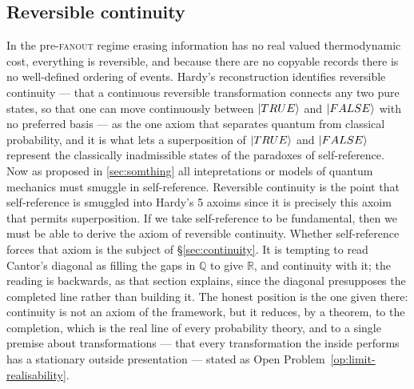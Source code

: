 \subsection{Reversible continuity}
\label{sec:reversible-continuity}
In the pre-\textsc{fanout} regime erasing information has no real valued thermodynamic cost, everything is
reversible, and because there are no copyable records there is no well-defined ordering of
events. Hardy's reconstruction \autocite{Hardy2001a} identifies reversible continuity --- that a
continuous reversible transformation connects any two pure states, so that one can move
continuously between $\ket{TRUE}$ and $\ket{FALSE}$ with no preferred basis --- as the one axiom
that separates quantum from classical probability, and it is what lets a superposition of
$\ket{TRUE}$ and $\ket{FALSE}$ represent the classically inadmissible states of the paradoxes of
self-reference. Now as proposed in \ref{sec:somthing} all intepretations or models of quantum mechanics
must smuggle in self-reference. Reversible continuity is the point that self-reference is
smuggled into Hardy's 5 axoims since it is precisely this axoim that permits superposition. 
If we take self-reference to be fundamental, then we must be able to derive the axiom of reversible
continuity. 
Whether self-reference forces that axiom is the subject of
\S\ref{sec:continuity}. It is tempting to read Cantor's diagonal as filling the gaps in
$\mathbb{Q}$ to give $\mathbb{R}$, and continuity with it; the reading is backwards, as that
section explains, since the diagonal presupposes the completed line rather than building it. The
honest position is the one given there: continuity is not an axiom of the framework, but it
reduces, by a theorem, to the completion, which is the real line of every probability theory,
and to a single premise about transformations --- that every transformation the inside performs
has a stationary outside presentation --- stated as Open Problem~\ref{op:limit-realisability}.

